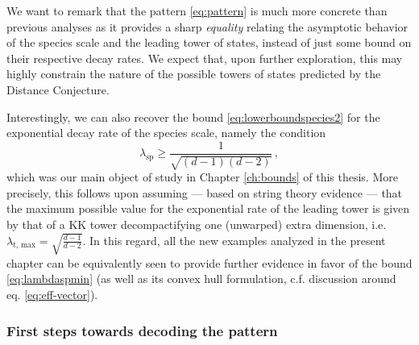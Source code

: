 We want to remark that the pattern \eqref{eq:pattern} is much more concrete than previous analyses as it provides a sharp \emph{equality} relating the asymptotic behavior of the species scale and the leading tower of states, instead of just some bound on their respective decay rates. We expect that, upon further exploration, this may highly constrain the nature of the possible towers of states predicted by the Distance Conjecture.
	
Interestingly, we can also recover the bound \eqref{eq:lowerboundspecies2} for the exponential decay rate of the species scale, namely the condition
%
\begin{equation}\label{eq:lambdaspmin}
	\lambda_{\text{sp}} \geq \frac{1}{\sqrt{(d-1)(d-2)}}\, ,
\end{equation}
%
which was our main object of study in Chapter \ref{ch:bounds} of this thesis. More precisely, this follows upon assuming --- based on string theory evidence \cite{Etheredge:2022opl,Etheredge:2023odp} --- that the maximum possible value for the exponential rate of the leading tower is given by that of a KK tower decompactifying one (unwarped) extra dimension, i.e. $\lambda_{\text{t, max}} = \sqrt{\frac{d-1}{d-2}}$. In this regard, all the new examples analyzed in the present chapter can be equivalently seen to provide further evidence in favor of the bound \eqref{eq:lambdaspmin} (as well as its convex hull formulation, c.f. discussion around eq. \eqref{eq:eff-vector}).
	
\subsubsection*{First steps towards decoding the pattern}
	
